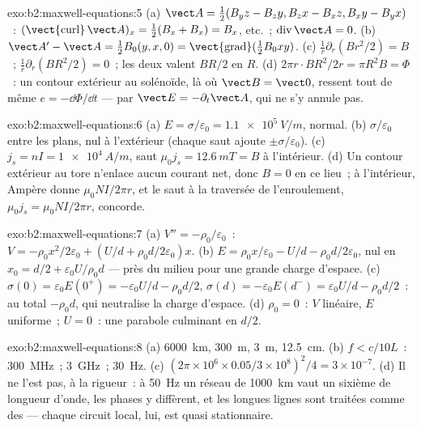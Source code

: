 \begin{solution}{exo:b2:maxwell-equations:5}
(a) $\vect A = \tfrac12(B_yz - B_zy, B_zx - B_xz, B_xy - B_yx)$~: $(\operatorname{\vect{curl}}
\vect A)_x = \tfrac12(B_x + B_x) = B_x$, etc.~; $\operatorname{div}\vect A = 0$. (b)
$\vect A' - \vect A = \tfrac12B_0(y, x, 0) = \operatorname{\vect{grad}}(\tfrac12B_0xy)$. (c)
$\frac1r\partial_r(Br^2/2) = B$~; $\frac1r\partial_r(BR^2/2) = 0$~; les deux valent $BR/2$ en
$R$. (d) $2\pi r\cdot BR^2/2r = \pi R^2B = \Phi$~: un contour extérieur au solénoïde,
là où $\vect B = \vect 0$, ressent tout de même $e = -\dd\Phi/\dd t$ --- par $\vect E =
-\partial_t\vect A$, qui ne s'y annule pas.
\end{solution}

\begin{solution}{exo:b2:maxwell-equations:6}
(a) $E = \sigma/\varepsilon_0 = \qty{1.1e5}{V/m}$, normal. (b) $\sigma/\varepsilon_0$ entre les plans, nul
à l'extérieur (chaque saut ajoute $\pm\sigma/\varepsilon_0$). (c) $j_s = nI = \qty{1e4}{A/m}$, saut
$\mu_0j_s = \qty{12.6}{mT} = B$ à l'intérieur. (d) Un contour extérieur au tore n'enlace
aucun courant net, donc $B = 0$ en ce lieu~; à l'intérieur, Ampère donne $\mu_0NI/2\pi r$,
et le saut à la traversée de l'enroulement, $\mu_0j_s = \mu_0NI/2\pi r$, concorde.
\end{solution}

\begin{solution}{exo:b2:maxwell-equations:7}
(a) $V'' = -\rho_0/\varepsilon_0$~: $V = -\rho_0x^2/2\varepsilon_0 + (U/d + \rho_0d/2\varepsilon_0)x$. (b)
$E = \rho_0x/\varepsilon_0 - U/d - \rho_0d/2\varepsilon_0$, nul en $x_0 = d/2 + \varepsilon_0U/\rho_0d$
--- près du milieu pour une grande charge d'espace. (c) $\sigma(0) = \varepsilon_0E(0^+) =
-\varepsilon_0U/d - \rho_0d/2$, $\sigma(d) = -\varepsilon_0E(d^-) = \varepsilon_0U/d - \rho_0d/2$~: au total
$-\rho_0d$, qui neutralise la charge d'espace. (d) $\rho_0 = 0$~: $V$ linéaire, $E$
uniforme~; $U = 0$~: une parabole culminant en $d/2$.
\end{solution}

\begin{solution}{exo:b2:maxwell-equations:8}
(a) \qty{6000}{km}, \qty{300}{m}, \qty{3}{m}, \qty{12.5}{cm}. (b) $f < c/10L$~:
\qty{300}{MHz}~; \qty{3}{GHz}~; \qty{30}{Hz}. (c) $(2\pi \times 10^6 \times 0.05/3 \times 10^8)^2/4 =
3 \times 10^{-7}$. (d) Il ne l'est pas, à la rigueur~: à \qty{50}{Hz} un réseau de \qty{1000}{km} vaut
un sixième de longueur d'onde, les phases y diffèrent, et les longues lignes sont
traitées comme des  --- chaque circuit local, lui, est
quasi stationnaire.
\end{solution}

